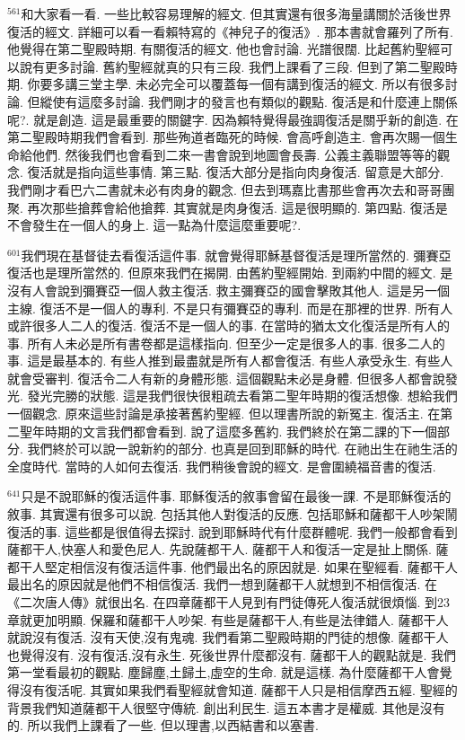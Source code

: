\documentclass{book}
\begin{document}
$^{561}$和大家看一看.
一些比較容易理解的經文.
但其實還有很多海量講關於活後世界復活的經文.
詳細可以看一看賴特寫的《神兒子的復活》.
那本書就會羅列了所有.
他覺得在第二聖殿時期.
有關復活的經文.
他也會討論.
光譜很闊.
比起舊約聖經可以說有更多討論.
舊約聖經就真的只有三段.
我們上課看了三段.
但到了第二聖殿時期.
你要多講三堂主學.
未必完全可以覆蓋每一個有講到復活的經文.
所以有很多討論.
但縱使有這麼多討論.
我們剛才的發言也有類似的觀點.
復活是和什麼連上關係呢?.
就是創造.
這是最重要的關鍵字.
因為賴特覺得最強調復活是關乎新的創造.
在第二聖殿時期我們會看到.
那些殉道者臨死的時候.
會高呼創造主.
會再次賜一個生命給他們.
然後我們也會看到二來一書會說到地圖會長壽.
公義主義聯盟等等的觀念.
復活就是指向這些事情.
第三點.
復活大部分是指向肉身復活.
留意是大部分.
我們剛才看巴六二書就未必有肉身的觀念.
但去到瑪嘉比書那些會再次去和哥哥團聚.
再次那些搶葬會給他搶葬.
其實就是肉身復活.
這是很明顯的.
第四點.
復活是不會發生在一個人的身上.
這一點為什麼這麼重要呢?.

$^{601}$我們現在基督徒去看復活這件事.
就會覺得耶穌基督復活是理所當然的.
彌賽亞復活也是理所當然的.
但原來我們在揭開.
由舊約聖經開始.
到兩約中間的經文.
是沒有人會說到彌賽亞一個人救主復活.
救主彌賽亞的國會擊敗其他人.
這是另一個主線.
復活不是一個人的專利.
不是只有彌賽亞的專利.
而是在那裡的世界.
所有人或許很多人二人的復活.
復活不是一個人的事.
在當時的猶太文化復活是所有人的事.
所有人未必是所有書卷都是這樣指向.
但至少一定是很多人的事.
很多二人的事.
這是最基本的.
有些人推到最盡就是所有人都會復活.
有些人承受永生.
有些人就會受審判.
復活令二人有新的身體形態.
這個觀點未必是身體.
但很多人都會說發光.
發光完勝的狀態.
這是我們很快很粗疏去看第二聖年時期的復活想像.
想給我們一個觀念.
原來這些討論是承接著舊約聖經.
但以理書所說的新冤主.
復活主.
在第二聖年時期的文言我們都會看到.
說了這麼多舊約.
我們終於在第二課的下一個部分.
我們終於可以說一說新約的部分.
也真是回到耶穌的時代.
在祂出生在祂生活的全度時代.
當時的人如何去復活.
我們稍後會說的經文.
是會圍繞福音書的復活.

$^{641}$只是不說耶穌的復活這件事.
耶穌復活的敘事會留在最後一課.
不是耶穌復活的敘事.
其實還有很多可以說.
包括其他人對復活的反應.
包括耶穌和薩都干人吵架鬧復活的事.
這些都是很值得去探討.
說到耶穌時代有什麼群體呢.
我們一般都會看到薩都干人,快塞人和愛色尼人.
先說薩都干人.
薩都干人和復活一定是扯上關係.
薩都干人堅定相信沒有復活這件事.
他們最出名的原因就是.
如果在聖經看.
薩都干人最出名的原因就是他們不相信復活.
我們一想到薩都干人就想到不相信復活.
在《二次唐人傳》就很出名.
在四章薩都干人見到有門徒傳死人復活就很煩惱.
到23章就更加明顯.
保羅和薩都干人吵架.
有些是薩都干人,有些是法律錯人.
薩都干人就說沒有復活.
沒有天使,沒有鬼魂.
我們看第二聖殿時期的門徒的想像.
薩都干人也覺得沒有.
沒有復活,沒有永生.
死後世界什麼都沒有.
薩都干人的觀點就是.
我們第一堂看最初的觀點.
塵歸塵,土歸土,虛空的生命.
就是這樣.
為什麼薩都干人會覺得沒有復活呢.
其實如果我們看聖經就會知道.
薩都干人只是相信摩西五經.
聖經的背景我們知道薩都干人很堅守傳統.
創出利民生.
這五本書才是權威.
其他是沒有的.
所以我們上課看了一些.
但以理書,以西結書和以塞書.
\end{document}
